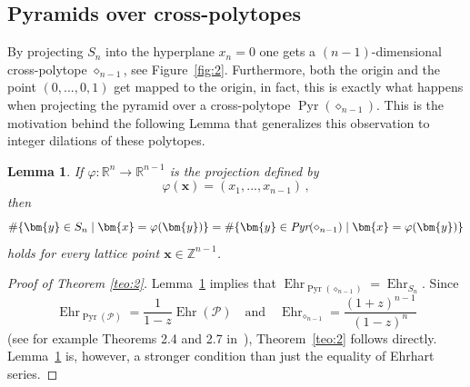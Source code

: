 \documentclass[a4paper,11pt,reqno]{amsart}
\DeclareMathOperator{\Ehr}{Ehr}
\DeclareMathOperator{\Pyr}{Pyr}
\newtheorem{lemma}[theorem]{Lemma}
\begin{document}
\subsection{Pyramids over cross-polytopes} \label{ssec:pyr}

By projecting $S_n$ into the hyperplane $x_n=0$ one gets a $(n-1)$-dimensional cross-polytope $\diamond_{n-1}$, 
see Figure~\ref{fig:2}. Furthermore, both the origin and the point $(0,...,0,1)$ get mapped to the origin, in fact, this is 
exactly what happens when projecting the pyramid over a cross-polytope $\Pyr (\diamond_{n-1})$. This is the motivation 
behind the following Lemma that generalizes this observation to integer dilations of these polytopes.
\begin{lemma} \label{teo:3}
If $\varphi: \mathbb{R}^n \longrightarrow \mathbb{R}^{n-1}$ is the projection defined by 
\[
\varphi(\bm{x})=(x_1, ..., x_{n-1})\,,
\]
then
\[
\#\{\bm{y} \in S_n \mid \bm{x}=\varphi (\bm{y}) \} = \#\{\bm{y} \in \emph{Pyr}(\diamond_{n-1}) \mid \bm{x}=\varphi (\bm{y}) \}
\]
holds for every lattice point $\bm{x} \in \mathbb{Z}^{n-1}$.
\end{lemma}
\begin{proof}[Proof of Theorem \ref{teo:2}]
Lemma~\ref{teo:3} implies that $\Ehr_{\Pyr (\diamond_{n-1})}=\Ehr_{S_n}$. Since 
\[
\Ehr_{\Pyr (\mathcal{P})} = \frac{1}{1-z} \Ehr (\mathcal{P}) \quad\text{and}\quad \Ehr_{\diamond_{n-1}}=\frac{(1+z)^{n-1}}{(1-z)^{n}}
\] 
(see for example Theorems 2.4 and 2.7 in~\cite{BR}),
Theorem~\ref{teo:2} follows directly. Lemma~\ref{teo:3} is, however, a stronger condition than just the equality of Ehrhart series.
\end{proof}
\end{document}
